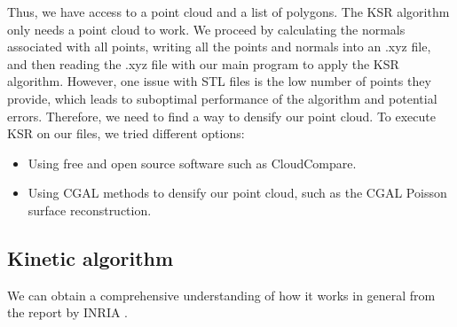 \documentclass{article}
\begin{document}
Thus, we have access to a point cloud and a list of polygons. The KSR algorithm only needs a point cloud to work. We proceed by calculating the normals associated with all points, 
writing all the points and normals into an .xyz file, and then reading the .xyz file with our main program to apply the KSR algorithm.
However, one issue with STL files is the low number of points they provide, which leads to suboptimal performance of the algorithm and potential errors. Therefore, we need to find a way to densify our point cloud.
To execute KSR on our files, we tried different options:

\begin{itemize}
  \item Using free and open source software such as CloudCompare.
  \item Using CGAL methods to densify our point cloud, such as the CGAL Poisson surface reconstruction.
\end{itemize}


\subsection{Kinetic algorithm}
We can obtain a comprehensive understanding of how it works in general from the report by INRIA \cite{yu:hal-03621896}.
\end{document}
